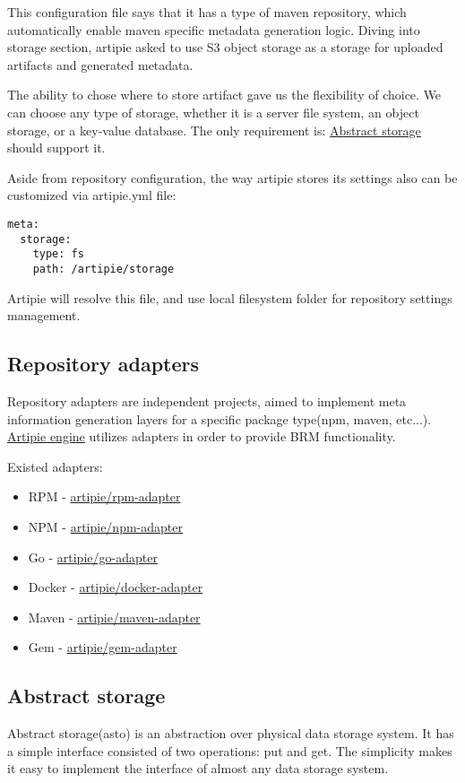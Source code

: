 \documentclass[12pt,oneside]{article}
\begin{document}
This configuration file says that it has a type of maven repository,
which automatically enable maven specific metadata generation logic.
Diving into storage section, artipie asked to use S3 object storage 
as a storage for uploaded artifacts and generated metadata.

The ability to chose where to store artifact gave us the flexibility of choice.
We can choose any type of storage, whether it is a server file system,
an object storage, or a key-value database.
The only requirement is: \hyperref[sec:asto]{Abstract storage} should support it.

Aside from repository configuration, the way artipie stores its settings
also can be customized via artipie.yml file:
\begin{Verbatim}[tabsize=2]
meta:
  storage:
    type: fs
    path: /artipie/storage
\end{Verbatim}
Artipie will resolve this file, and use local filesystem folder for repository settings management. 

\subsection{Repository adapters}
Repository adapters are independent projects, 
aimed to implement meta information generation
layers for a specific package type(npm, maven, etc...).
\hyperref[sec:arti-engine]{Artipie engine} utilizes adapters in order to provide BRM functionality.

Existed adapters:
\begin{itemize}
	\item RPM - \href{https://github.com/artipie/rpm-adapter}{artipie/rpm-adapter}
	\item NPM - \href{https://github.com/artipie/npm-adapter}{artipie/npm-adapter}
	\item Go - \href{https://github.com/artipie/go-adapter}{artipie/go-adapter}
	\item Docker - \href{https://github.com/artipie/docker-adapter}{artipie/docker-adapter}
	\item Maven - \href{https://github.com/artipie/maven-adapter}{artipie/maven-adapter}
	\item Gem - \href{https://github.com/artipie/gem-adapter}{artipie/gem-adapter}
\end{itemize}

\subsection{Abstract storage}
\label{sec:asto}
Abstract storage(asto) is an abstraction over physical data storage system.
It has a simple interface consisted of two operations: put and get.
The simplicity makes it easy to implement the interface of almost any data storage system.
\end{document}
